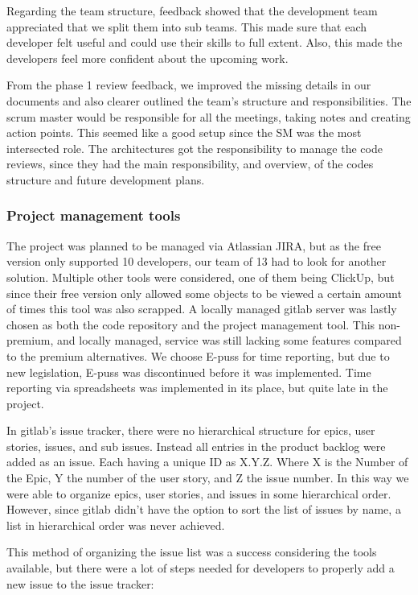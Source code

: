 \documentclass{article}
\begin{document}
Regarding the team structure, feedback showed that the development team appreciated that we split them into sub teams. This made sure that each developer felt useful and could use their skills to full extent. Also, this made the developers feel more confident about the upcoming work. 

From the phase 1 review feedback, we improved the missing details in our documents and also clearer outlined the team's structure and responsibilities. The scrum master would be responsible for all the meetings, taking notes and creating action points. This seemed like a good setup since the SM was the most intersected role. The architectures got the responsibility to manage the code reviews, since they had the main responsibility, and overview, of the codes structure and future development plans.

\subsubsection{Project management tools}\label{project_tools}

The project was planned to be managed via Atlassian JIRA, but as the free version only supported 10 developers, our team of 13 had to look for another solution. Multiple other tools were considered, one of them being ClickUp, but since their free version only allowed some objects to be viewed a certain amount of times this tool was also scrapped. A locally managed gitlab server was lastly chosen as both the code repository and the project management tool. This non-premium, and locally managed, service was still lacking some features compared to the premium alternatives. We choose E-puss for time reporting, but due to new legislation, E-puss was discontinued before it was implemented. Time reporting via spreadsheets was implemented in its place, but quite late in the project.

In gitlab's issue tracker, there were no hierarchical structure for epics, user stories, issues, and sub issues. Instead all entries in the product backlog were added as an issue. Each having a unique ID as X.Y.Z. Where X is the Number of the Epic, Y the number of the user story, and Z the issue number. In this way we were able to organize epics, user stories, and issues in some hierarchical order. However, since gitlab didn't have the option to sort the list of issues by name, a list in hierarchical order was never achieved.

This method of organizing the issue list was a success considering the tools available, but there were a lot of steps needed for developers to properly add a new issue to the issue tracker:
\end{document}
